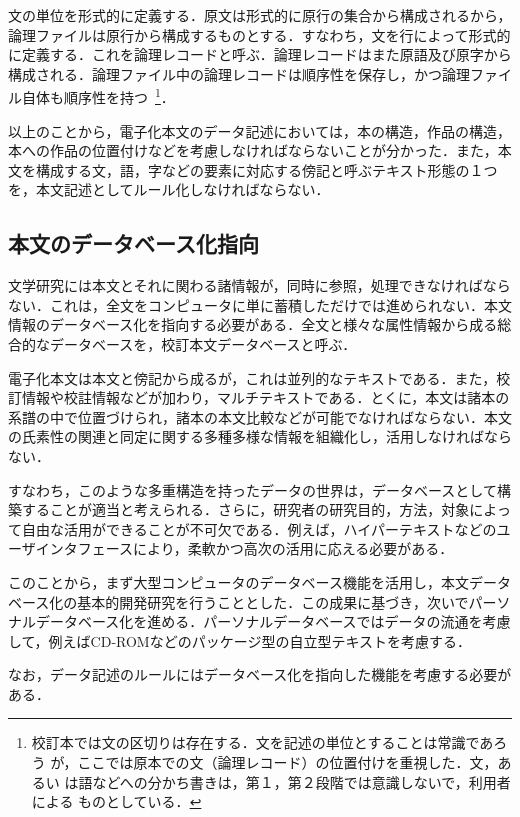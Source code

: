 文の単位を形式的に定義する．原文は形式的に原行の集合から構成されるから，
論理ファイルは原行から構成するものとする．すなわち，文を行によって形式的
に定義する．これを論理レコードと呼ぶ．論理レコードはまた原語及び原字から
構成される．論理ファイル中の論理レコードは順序性を保存し，かつ論理ファイ
ル自体も順序性を持つ~\footnote{
  校訂本では文の区切りは存在する．文を記述の単位とすることは常識であろう
  が，ここでは原本での文（論理レコード）の位置付けを重視した．文，あるい
  は語などへの分かち書きは，第１，第２段階では意識しないで，利用者による
  ものとしている．}．

以上のことから，電子化本文のデータ記述においては，本の構造，作品の構造，
本への作品の位置付けなどを考慮しなければならないことが分かった．また，本
文を構成する文，語，字などの要素に対応する傍記と呼ぶテキスト形態の１つ
を，本文記述としてルール化しなければならない．



\subsection{本文のデータベース化指向}
\label{sec:2.3setu}

文学研究には本文とそれに関わる諸情報が，同時に参照，処理できなければなら
ない．これは，全文をコンピュータに単に蓄積しただけでは進められない．本文
情報のデータベース化を指向する必要がある．全文と様々な属性情報から成る総
合的なデータベースを，校訂本文データベースと呼ぶ．

電子化本文は本文と傍記から成るが，これは並列的なテキストである．また，校
訂情報や校註情報などが加わり，マルチテキストである．とくに，本文は諸本の
系譜の中で位置づけられ，諸本の本文比較などが可能でなければならない．本文
の氏素性の関連と同定に関する多種多様な情報を組織化し，活用しなければなら
ない．

すなわち，このような多重構造を持ったデータの世界は，データベースとして構
築することが適当と考えられる．さらに，研究者の研究目的，方法，対象によっ
て自由な活用ができることが不可欠である．例えば，ハイパーテキストなどのユ
ーザインタフェースにより，柔軟かつ高次の活用に応える必要がある．

このことから，まず大型コンピュータのデータベース機能を活用し，本文データ
ベース化の基本的開発研究を行うこととした．この成果に基づき，次いでパーソ
ナルデータベース化を進める．パーソナルデータベースではデータの流通を考慮
して，例えばCD-ROMなどのパッケージ型の自立型テキストを考慮する．

なお，データ記述のルールにはデータベース化を指向した機能を考慮する必要が
ある．



